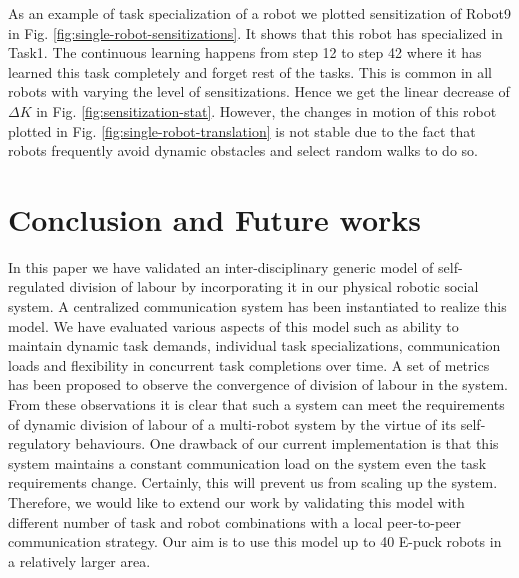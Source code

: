 \documentclass{llncs}
\begin{document}
As an example of task specialization of a robot we plotted sensitization of Robot9 in Fig. \ref{fig:single-robot-sensitizations}. It shows that this robot has specialized in Task1. The continuous learning happens from step 12 to step 42 where it has learned this task completely and forget rest of the tasks. This is common in all robots with varying the level of sensitizations. Hence we get the linear decrease of $\Delta K$ in Fig. \ref{fig:sensitization-stat}. However, the changes in motion of this robot plotted in Fig. \ref{fig:single-robot-translation} is not stable due to the fact that robots frequently avoid dynamic obstacles and select random walks to do so.
\section{Conclusion and Future works}
\label{sec:conc}
In this paper we have validated an inter-disciplinary generic model of self-regulated division of labour by incorporating it in our physical robotic social system. A centralized communication system has been instantiated to realize this model. We have evaluated various aspects of this model such as ability to maintain dynamic task demands, individual task specializations, communication loads and flexibility in concurrent task completions over time. A set of metrics has been proposed to observe the convergence of division of labour in the system. From these observations it is clear that such a system can meet the requirements of dynamic division of labour of a multi-robot system by the virtue of its self-regulatory behaviours. One drawback of our current implementation is that this system maintains a constant communication load on the system even the task requirements change. Certainly, this will prevent us from scaling up the system. Therefore, we would like to extend our work by validating this model with different number of task and robot combinations with a local peer-to-peer communication strategy. Our aim is to use this model up to 40 E-puck robots in a relatively larger area.
\end{document}
